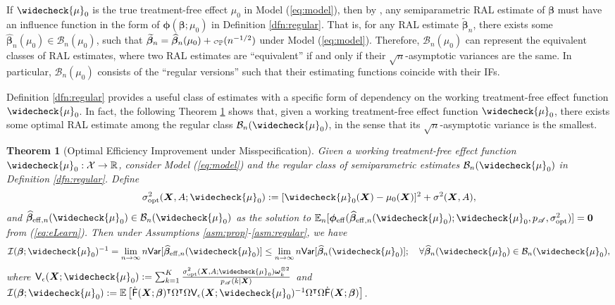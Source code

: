 \documentclass[11pt]{article}
\newtheorem{thm}{Theorem}
\theoremstyle{definition}
\theoremstyle{remark}
\newcommand{\bX}{\bm{X}}
\newcommand{\bbeta}{\bm{\beta}}
\newcommand{\bomega}{\bm{\omega}}
\newcommand{\bphi}{\bm{\phi}}
\newcommand{\bbE}{\mathbb{E}}
\newcommand{\bbP}{\mathbb{P}}
\newcommand{\bbR}{\mathbb{R}}
\newcommand{\cB}{\mathcal{B}}
\newcommand{\cI}{\mathcal{I}}
\newcommand{\cX}{\mathcal{X}}
\newcommand{\sA}{\mathscr{A}}
\newcommand{\sfF}{\mathsf{F}}
\newcommand{\sfV}{\mathsf{V}}
\newcommand\smallcO{
	\mathchoice
	{{\scriptscriptstyle\mathcal{O}}}%
	{{\scriptscriptstyle\mathcal{O}}}%
	{{\scriptscriptstyle\mathcal{O}}}%
	{\scalebox{.5}{$\scriptscriptstyle\mathcal{O}$}}%
}
\newcommand{\sfvar}{\mathsf{Var}}
\newcommand{\bzero}{\mathbf{0}}	%
\newcommand{\eff}{\mathrm{eff}}
\newcommand{\opt}{\mathrm{opt}}
\begin{document}
If $ \widecheck{\mu}_{0} $ is the true treatment-free effect $ \mu_{0} $ in Model (\ref{eq:model}), then by \citet[Theorem 4.2]{tsiatis2007semiparametric}, any semiparametric RAL estimate of $ \bbeta $ must have an influence function in the form of $ \bphi(\bbeta;\mu_{0}) $ in Definition \ref{dfn:regular}. That is, for any RAL estimate $ \widetilde{\bbeta}_{n} $, there exists some $ \widehat{\bbeta}_{n}(\mu_{0}) \in \cB_{n}(\mu_{0}) $, such that $ \widetilde{\bbeta}_{n} = \widehat{\bbeta}_{n}(\mu_{0})+ \smallcO_{\bbP}(n^{-1/2}) $ under Model (\ref{eq:model}). Therefore, $ \cB_{n}(\mu_{0}) $ can represent the equivalent classes of RAL estimates, where two RAL estimates are ``equivalent'' if and only if their $ \sqrt{n} $-asymptotic variances are the same. In particular, $ \cB_{n}(\mu_{0}) $ consists of the ``regular versions'' such that their estimating functions coincide with their IFs. 

Definition \ref{dfn:regular} provides a useful class of estimates with a specific form of dependency on the working treatment-free effect function $ \widecheck{\mu}_{0} $. In fact, the following Theorem \ref{thm:eff_opt} shows that, given a working treatment-free effect function $ \widecheck{\mu}_{0} $, there exists some optimal RAL estimate among the regular class $ \cB_{n}(\widecheck{\mu}_{0}) $, in the sense that its $ \sqrt{n} $-asymptotic variance is the smallest.

\begin{thm}[Optimal Efficiency Improvement under Misspecification]\label{thm:eff_opt}
	Given a working treatment-free effect function $ \widecheck{\mu}_{0}:\cX \to \bbR $, consider Model (\ref{eq:model}) and the regular class of semiparametric estimates $ \cB_{n}(\widecheck{\mu}_{0}) $ in Definition \ref{dfn:regular}. Define 
	\[ \sigma_{\opt}^{2}(\bX,A;\widecheck{\mu}_{0}) := [\widecheck{\mu}_{0}(\bX) - \mu_{0}(\bX)]^{2} + \sigma^{2}(\bX,A), \]
	and $ \widehat{\bbeta}_{\eff,n}(\widecheck{\mu}_{0}) \in \cB_{n}(\widecheck{\mu}_{0}) $ as the solution to $ \bbE_{n}[\bphi_{\eff}(\widehat{\bbeta}_{\eff,n}(\widecheck{\mu}_{0});\widecheck{\mu}_{0},p_{\sA},\sigma_{\opt}^{2})] = \bzero $ from (\ref{eq:eLearn}). Then under Assumptions \ref{asm:prop}-\ref{asm:regular}, we have
	\[ \cI(\bbeta;\widecheck{\mu}_{0})^{-1} = \lim_{n\to\infty}n\sfvar[\widehat{\bbeta}_{\eff,n}(\widecheck{\mu}_{0})] \le \lim_{n\to\infty}n\sfvar[\widehat{\bbeta}_{n}(\widecheck{\mu}_{0})]; \quad \forall \widehat{\bbeta}_{n}(\widecheck{\mu}_{0})\in \cB_{n}(\widecheck{\mu}_{0}), \]
	where $ \sfV_{\epsilon}(\bX;\widecheck{\mu}_{0}) := \sum_{k=1}^{K}{\sigma_{\opt}^{2}(\bX,A;\widecheck{\mu}_{0})\bomega_{k}^{\otimes 2} \over p_{\sA}(k|\bX)} $ and  $ \cI(\bbeta;\widecheck{\mu}_{0}) := \bbE\left[ \dot{\sfF}(\bX;\bbeta)^{\intercal}\Omega^{\intercal}\Omega\sfV_{\epsilon}(\bX;\widecheck{\mu}_{0})^{-1}\Omega^{\intercal}\Omega\dot{\sfF}(\bX;\bbeta) \right] $.
\end{thm}
\end{document}
